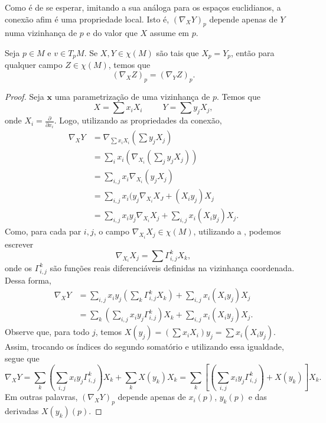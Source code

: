 Como é de se esperar, imitando a sua análoga para os espaços euclidianos, a conexão afim é uma propriedade local. Isto é, $(\nabla_{X}Y)_{p}$ depende apenas de $Y$ numa vizinhança de $p$ e do valor que $X$ assume em $p$.
\begin{lemma}
	\label{lem:conexao-afim-local}
	Seja $p \in M$ e $v \in T_{p}M$. Se $X, Y \in \chi(M)$ são tais que $X_{p}=Y_{p}$, então para qualquer campo $Z \in \chi(M)$, temos que
	\begin{equation*}
		(\nabla_{X}Z)_{p}=(\nabla _{Y}Z)_{p}.
	\end{equation*}
	\begin{proof}

		Seja $\mathbf{x}$ uma parametrização de uma vizinhança de $p$. Temos que
		\begin{equation*}
			X=\sum x_i X_{i} \ \ \ \ \ \ \ \ \ \ \ Y=\sum y_{j}X_{j},
		\end{equation*}
		onde $X_{i}=\frac{\partial}{\partial x_{i}}$.
		Logo, utilizando as propriedades da conexão,
		\begin{align*}
			\nabla_{X}Y & = \nabla_{\sum x_{i}X_{i}}\left( \sum y_{j}X_{j} \right)                       \\
			            & =\sum_{i} x_{i}\left( \nabla_{X_{i}}\left( \sum_{j} y_{j}X_{j} \right) \right) \\
			            & =\sum_{i,j}x_{i}\nabla_{X_{i}}(y_{j}X_{j})                                     \\
			            & =\sum_{i,j}x_{i}(y_{j}\nabla_{X_{i}}X_{J}+(X_{i}y_{j})X_{j}                    \\
			            & = \sum_{i,j}x_{i}y_{j}\nabla_{X_{i}}X_{j}+\sum_{i,j}x_{i}(X_{i}y_{j})X_{j}.
		\end{align*}
		Como, para cada par $i, j$, o campo $\nabla_{X_{i}}X_{j}\in \chi(M)$, utilizando a , podemos escrever
		\begin{equation*}
			\nabla_{X_{i}}X_{j}=\sum \Gamma_{i,j}^{k}X_{k},
		\end{equation*}
		onde os $\Gamma_{i,j}^{k}$ são funções reais diferenciáveis definidas na vizinhança coordenada.
		Dessa forma,
		\begin{align*}
			\nabla_{X}Y & = \sum_{i,j} x_{i}y_{j}\left( \sum_{k}\Gamma_{i,j}^{k}X_{k}\right)+\sum_{i,j}x_{i}(X_{i}y_{j})X_{j}   \\
			            & =\sum_{k}\left( \sum_{i,j}x_{i}y_{j}\Gamma_{i,j}^{k} \right)X_{k} + \sum_{i,j}x_{i}(X_{i}y_{j})X_{j}.
		\end{align*}
		Observe que, para todo $j$, temos $X(y_{j})=\left( \sum x_{i}X_{i} \right)y_{j}=\sum x_{i}(X_{i}y_{j})$. Assim, trocando os índices do segundo somatório e utilizando essa igualdade, segue que
		\begin{equation*}
			\nabla_{X}Y=\sum_{k}\left( \sum_{i,j}x_{i}y_{j}\Gamma_{i,j}^{k} \right)X_{k} + \sum_{k}X(y_{k})X_{k}= \sum_{k}\left[\left( \sum_{i,j}x_{i}y_{j}\Gamma_{i,j}^{k} \right)+X(y_{k})\right]X_{k}.
		\end{equation*}
		Em outras palavras, $(\nabla_{X}Y)_{p}$ depende apenas de $x_{i}(p)$, $y_{k}(p)$ e das derivadas $X(y_{k})(p)$.


\end{proof}
\end{lemma}
